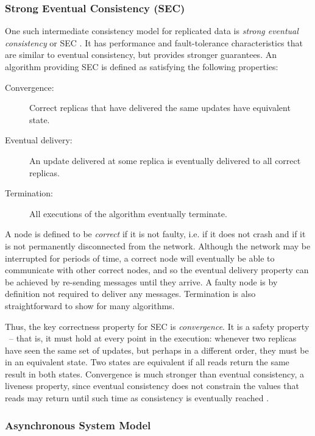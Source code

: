 \subsubsection{Strong Eventual Consistency (SEC)}

One such intermediate consistency model for replicated data is \emph{strong eventual consistency} or
SEC \cite{Shapiro:2011un}. It has performance and fault-tolerance characteristics that are similar
to eventual consistency, but provides stronger guarantees. An algorithm providing SEC is defined as
satisfying the following properties:

\begin{description}
\item[Convergence:] Correct replicas that have delivered the same updates have equivalent state.
\item[Eventual delivery:] An update delivered at some replica is eventually delivered to all correct
replicas.
\item[Termination:] All executions of the algorithm eventually terminate.
\end{description}

A node is defined to be \emph{correct} if it is not faulty, i.e. if it does not crash and if it is
not permanently disconnected from the network. Although the network may be interrupted for periods
of time, a correct node will eventually be able to communicate with other correct nodes, and so the
eventual delivery property can be achieved by re-sending messages until they arrive. A faulty node
is by definition not required to deliver any messages. Termination is also straightforward to show
for many algorithms.

Thus, the key correctness property for SEC is \emph{convergence}. It is a safety property
\cite{Alpern:1985dg}~-- that is, it must hold at every point in the execution: whenever two replicas
have seen the same set of updates, but perhaps in a different order, they must be in an equivalent
state. Two states are equivalent if all reads return the same result in both states. Convergence is
much stronger than eventual consistency, a liveness property, since eventual consistency does not
constrain the values that reads may return until such time as consistency is eventually reached
\cite{Bailis:2013jc}.

\subsubsection{Asynchronous System Model}

